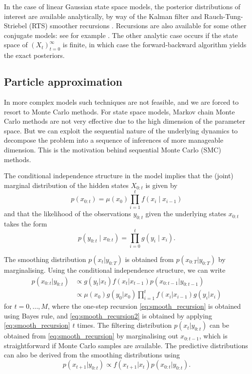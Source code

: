 \documentclass[fleqn]{article}
\begin{document}
In the case of linear Gaussian state space models, the posterior distributions of interest are available analytically, by way of the Kalman filter \citep{kalman1960} and Rauch-Tung-Striebel (RTS) smoother recursions \citep{rauch1965}. Recursions are also available for some other conjugate models: see for example \citet{vidoni1999}.
The other analytic case occurs if the state space of $(X_t)_{t=0}^\infty$ is finite, in which case the forward-backward algorithm \citep{baum1970} yields the exact posteriors.

\subsection{Particle approximation}
In more complex models such techniques are not feasible, and we are forced to resort to Monte Carlo methods.
For state space models, Markov chain Monte Carlo methods are not very effective due to the high dimension of the parameter space. But we can exploit the sequential nature of the underlying dynamics to decompose the problem into a sequence of inferences of more manageable dimension.
This is the motivation behind sequential Monte Carlo (SMC) methods.

The conditional independence structure in the model implies that the (joint) marginal distribution of the hidden states $X_{0:t}$ is given by
\begin{equation*} \label{eq:hmm_marginal}
p(x_{0:t}) = \mu(x_0) \prod_{i=1}^t f(x_i \mid x_{i-1})
\end{equation*}
and that the likelihood of the observations $y_{0:t}$ given the underlying states $x_{0:t}$ takes the form
\begin{equation*} \label{eq:hmm_likelihood}
p(y_{0:t} \mid x_{0:t}) = \prod_{i=0}^t g(y_i \mid x_i).
\end{equation*}

The smoothing distribution $p(x_{t} | y_{0:T})$ is obtained from $p(x_{0:T} | y_{0:T})$ by marginalising. Using the conditional independence structure, we can write
\begin{align}
p(x_{0:t} | y_{0:t}) &\propto g(y_t | x_t) f(x_t | x_{t-1}) p(x_{0:t-1} | y_{0:t-1}) \label{eq:smooth_recursion}\\
&\propto \mu(x_0) g(y_0 | x_0) \prod_{i=1}^t f(x_i | x_{i-1}) g(y_i | x_i) \label{eq:smooth_recursion2}
\end{align}
for $t = 0,\dots,M$, where the one-step recursion \eqref{eq:smooth_recursion} is obtained using Bayes rule, and \eqref{eq:smooth_recursion2} is obtained by applying \eqref{eq:smooth_recursion} $t$ times. 
The filtering distribution $p(x_t | y_{0:t})$ can be obtained from \eqref{eq:smooth_recursion} by marginalising out $x_{0:t-1}$, which is straightforward if Monte Carlo samples are available.
The predictive distributions can also be derived from the smoothing distributions using
\begin{equation*}
p(x_{t+1} | y_{0:t}) \propto f(x_{t+1} | x_t) p(x_{0:t} | y_{0:t}).
\end{equation*}
\end{document}
